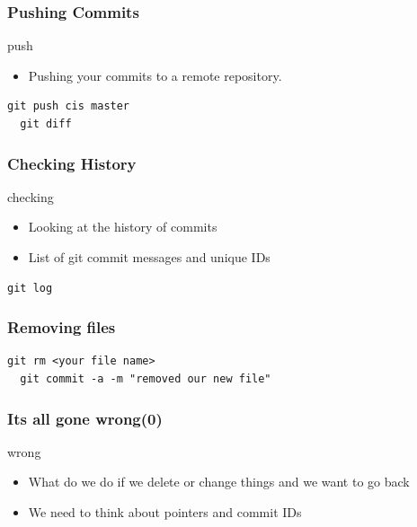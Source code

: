 \documentclass{beamer}
\begin{document}

\begin{frame}[fragile]
  \frametitle{Pushing Commits}
  
  \begin{block}{push}
    \begin{itemize}  
      \item Pushing your commits to a remote repository.
    \end{itemize}
  \end{block}

  \begin{lstlisting}[caption=git push] 
  git push cis master
  git diff
  \end{lstlisting}
\end{frame}

\begin{frame}[fragile]
  \frametitle{Checking History}
  
  \begin{block}{checking}
    \begin{itemize}  
      \item Looking at the history of commits
      \item List of git commit messages and unique IDs
    \end{itemize}
  \end{block}

  \begin{lstlisting}[caption=git log] 
  git log
  \end{lstlisting}
\end{frame}


\begin{frame}[fragile]
  \frametitle{Removing files}
  
  \begin{lstlisting}[caption=Removing Files] 
  git rm <your file name>
  git commit -a -m "removed our new file"
  \end{lstlisting}

\end{frame}


\begin{frame}[fragile]
  \frametitle{Its all gone wrong(0)}

  \begin{block}{wrong}
   \begin{itemize}  
      \item What do we do if we delete or change things and we want to go back
      \item We need to think about pointers and commit IDs
    \end{itemize}
  \end{block}


\end{frame}
\end{document}
